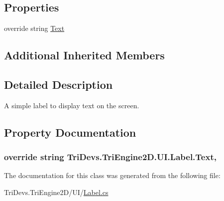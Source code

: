 \subsection*{Properties}
\begin{DoxyCompactItemize}
\item 
override string \hyperlink{class_tri_devs_1_1_tri_engine2_d_1_1_u_i_1_1_label_a06d91dd4e855e27c97b5b652653e4971}{Text}
\end{DoxyCompactItemize}
\subsection*{Additional Inherited Members}


\subsection{Detailed Description}
A simple label to display text on the screen. 



\subsection{Property Documentation}
\hypertarget{class_tri_devs_1_1_tri_engine2_d_1_1_u_i_1_1_label_a06d91dd4e855e27c97b5b652653e4971}{
\subsubsection[{Text}]{\setlength{\rightskip}{0pt plus 5cm}override string Tri\-Devs.\-Tri\-Engine2\-D.\-U\-I.\-Label.\-Text\hspace{0.3cm}{\ttfamily [get]}, {\ttfamily [set]}}}\label{class_tri_devs_1_1_tri_engine2_d_1_1_u_i_1_1_label_a06d91dd4e855e27c97b5b652653e4971}


The documentation for this class was generated from the following file\-:\begin{DoxyCompactItemize}
\item 
Tri\-Devs.\-Tri\-Engine2\-D/\-U\-I/\hyperlink{_label_8cs}{Label.\-cs}\end{DoxyCompactItemize}
